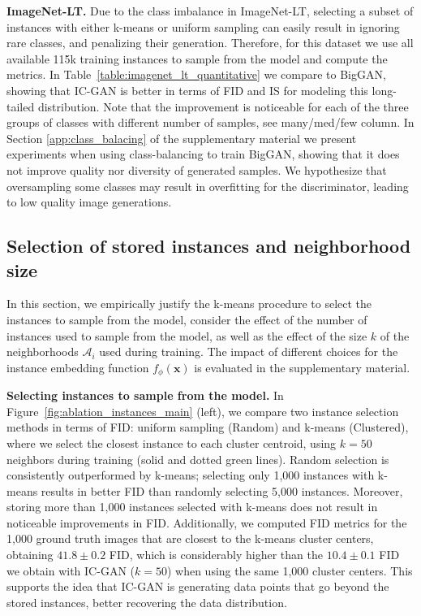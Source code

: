 \textbf{ImageNet-LT.}  
Due to the class imbalance in ImageNet-LT, selecting a subset of instances with either k-means or uniform sampling can easily result in ignoring rare classes,  and penalizing their generation. Therefore, for this dataset we use all available 115k training instances to sample from the model and compute the metrics. In Table~\ref{table:imagenet_lt_quantitative} we compare to BigGAN, showing that {IC-GAN} is better in terms of FID and IS for modeling this long-tailed distribution. Note that the improvement is noticeable for each of the three groups of classes with different number of samples, see  many/med/few column. In Section \ref{app:class_balacing} of the supplementary material we present experiments when using  class-balancing to train BigGAN, showing that it does not improve quality nor diversity of generated samples. We hypothesize that oversampling some classes may result in overfitting for the discriminator, leading to low quality image generations.

\subsection{Selection of stored instances and neighborhood size}
\label{sec:ablation}

In this section, we empirically justify the k-means procedure to select the instances to sample from the model,  consider the effect of the number of instances used to sample from the model, as well as the effect of the size $k$ of the neighborhoods $\mathcal{A}_i$ used during training. The impact of different choices for the instance embedding function $f_\phi(\mathbf{x})$ is evaluated in the supplementary material.

\textbf{Selecting instances to sample from the model.}
\label{subsubsec:instance_selection}
In Figure~\ref{fig:ablation_instances_main} (left), we compare two instance selection methods in terms of FID: uniform sampling (Random) and k-means (Clustered), where we select the closest instance to each cluster centroid,  using  $k\!=\!50$ neighbors during training (solid and dotted green  lines). Random selection is  consistently outperformed by k-means; selecting only 1,000 instances with k-means results in better FID than randomly selecting 5,000 instances. Moreover, storing more than 1,000 instances selected with k-means does not result in noticeable improvements in  FID. Additionally, we computed FID metrics for the 1,000 ground truth images that are closest to the k-means cluster centers, obtaining $41.8 \pm 0.2$ FID, which is considerably higher than the $10.4 \pm 0.1 $ FID we obtain with {IC-GAN} ($k=50$) when using the same 1,000 cluster centers. This supports the idea that {IC-GAN} is generating data points that go beyond the stored instances, better recovering the data distribution. 

